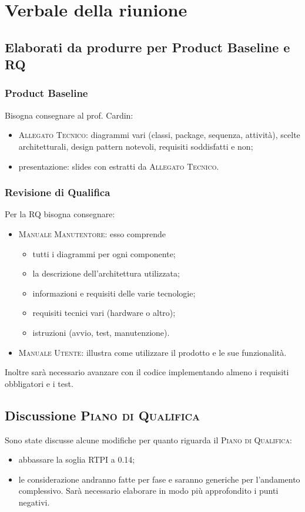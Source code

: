 \section{Verbale della riunione}

\subsection{ Elaborati da produrre per Product Baseline e RQ}
\subsubsection{Product Baseline}
Bisogna consegnare al prof. Cardin:
\begin{itemize}
	\item \textsc{Allegato Tecnico}: diagrammi vari (classi, package, sequenza, attività), scelte architetturali, design pattern notevoli, requisiti soddisfatti e non;
	\item presentazione: slides con estratti da \textsc{Allegato Tecnico}.
\end{itemize}

\subsubsection{Revisione di Qualifica}
Per la RQ bisogna consegnare:
\begin{itemize}
	\item \textsc{Manuale Manutentore}: esso comprende 
	\begin{itemize}
		\item tutti i diagrammi per ogni componente;
		\item la descrizione dell'architettura utilizzata;
		\item informazioni e requisiti delle varie tecnologie;
		\item requisiti tecnici vari (hardware o altro);
		\item istruzioni (avvio, test, manutenzione).
	\end{itemize}
	\item \textsc{Manuale Utente}: illustra come utilizzare il prodotto e le sue funzionalità.
\end{itemize}
Inoltre sarà necessario avanzare con il codice implementando almeno i requisiti obbligatori e i test.


\subsection{Discussione \textsc{Piano di Qualifica}}
Sono state discusse alcune modifiche per quanto riguarda il \textsc{Piano di Qualifica}:
\begin{itemize}
	\item abbassare la soglia RTPI a 0.14;
	\item le considerazione andranno fatte per fase e saranno generiche per l'andamento complessivo. Sarà necessario elaborare in modo più approfondito i punti negativi.
\end{itemize}

